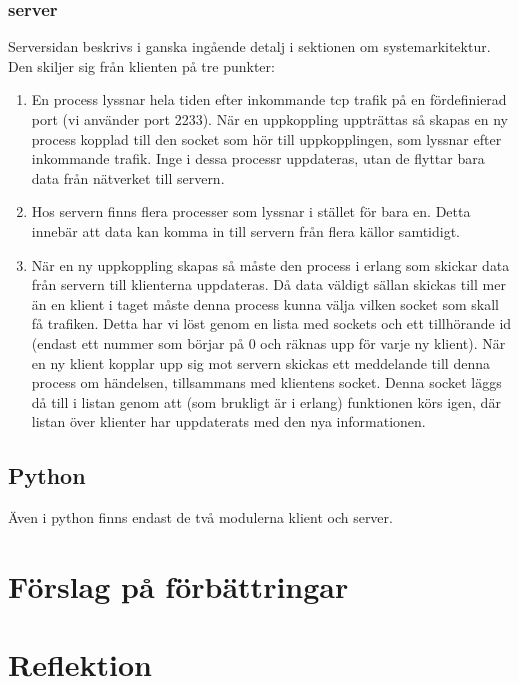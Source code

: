 \documentclass{scrartcl}
\begin{document}
\subsubsection{server}
Serversidan beskrivs i ganska ingående detalj i sektionen om systemarkitektur. Den skiljer sig från klienten på tre punkter:
\begin{enumerate}
\item En process lyssnar hela tiden efter inkommande tcp trafik på en fördefinierad port (vi använder port 2233). När en uppkoppling uppträttas så skapas en ny process kopplad till den socket som hör till uppkopplingen, som lyssnar efter inkommande trafik. Inge i dessa processr uppdateras, utan de flyttar bara data från nätverket till servern.
\smallskip
\item Hos servern finns flera processer som lyssnar i stället för bara en. Detta innebär att data kan komma in till servern från flera källor samtidigt.
\smallskip
\item När en ny uppkoppling skapas så måste den process i erlang som skickar data från servern till klienterna uppdateras. Då data väldigt sällan skickas till mer än en klient i taget måste denna process kunna välja vilken socket som skall få trafiken. \linebreak
Detta har vi löst genom en lista med sockets och ett tillhörande id (endast ett nummer som börjar på 0 och räknas upp för varje ny klient). När en ny klient kopplar upp sig mot servern skickas ett meddelande till denna process om händelsen, tillsammans med klientens socket. Denna socket läggs då till i listan genom att (som brukligt är i erlang) funktionen körs igen, där listan över klienter har uppdaterats med den nya informationen.
\end{enumerate}

\smallskip
\subsection{Python}
Även i python finns endast de två modulerna klient och server.

\smallskip
\section{Förslag på förbättringar}

\smallskip
\section{Reflektion}
\end{document}
